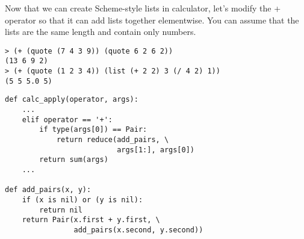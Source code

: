 \question Now that we can create Scheme-style lists in calculator, let's modify the + operator so
that it can add lists together elementwise. You can assume that the lists are the same
length and contain only numbers.
\begin{lstlisting}
> (+ (quote (7 4 3 9)) (quote 6 2 6 2))
(13 6 9 2)
> (+ (quote (1 2 3 4)) (list (+ 2 2) 3 (/ 4 2) 1))
(5 5 5.0 5)
\end{lstlisting}
\begin{solution}[1.5in]
\begin{lstlisting}
def calc_apply(operator, args):
    ...
    elif operator == '+':
        if type(args[0]) == Pair:
            return reduce(add_pairs, \
                          args[1:], args[0])
        return sum(args)
    ...

def add_pairs(x, y):
    if (x is nil) or (y is nil):
        return nil
    return Pair(x.first + y.first, \
                add_pairs(x.second, y.second))
\end{lstlisting}
\end{solution}
